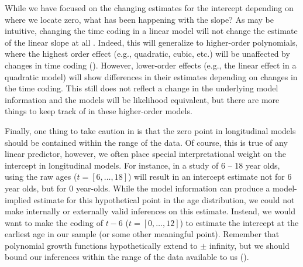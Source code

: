 \documentclass[11pt]{article}
\begin{document}
While we have focused on the changing estimates for the intercept depending on where we locate zero, what has been happening with the slope? As may be intuitive, changing the time coding in a linear model will not change the estimate of the linear slope at all . Indeed, this will generalize to higher-order polynomials, where the highest order effect (e.g., quadratic, cubic, etc.) will be unaffected by changes in time coding (\cite{biesanz_role_2004}). However, lower-order effects (e.g., the linear effect in a quadratic model) will show differences in their estimates depending on changes in the time coding. This still does not reflect a change in the underlying model information and the models will be likelihood equivalent, but there are more things to keep track of in these higher-order models.

Finally, one thing to take caution in is that the zero point in longitudinal models should be contained within the range of the data. Of course, this is true of any linear predictor, however, we often place special interpretational weight on the intercept in longitudinal models. For instance, in a study of 6 -- 18 year olds, using the raw ages ($t = [6, \ldots, 18]$) will result in an intercept estimate not for 6 year olds, but for 0 year-olds. While the model information can produce a model-implied estimate for this hypothetical point in the age distribution, we could not make internally or externally valid inferences on this estimate. Instead, we would want to make the coding of $t - 6$ ($t = [0, \ldots, 12]$) to estimate the intercept at the earliest age in our sample (or some other meaningful point). Remember that polynomial growth functions hypothetically extend to $\pm$ infinity, but we should bound our inferences within the range of the data available to us (\cite{hancock_vernacular_2006}).
\end{document}
